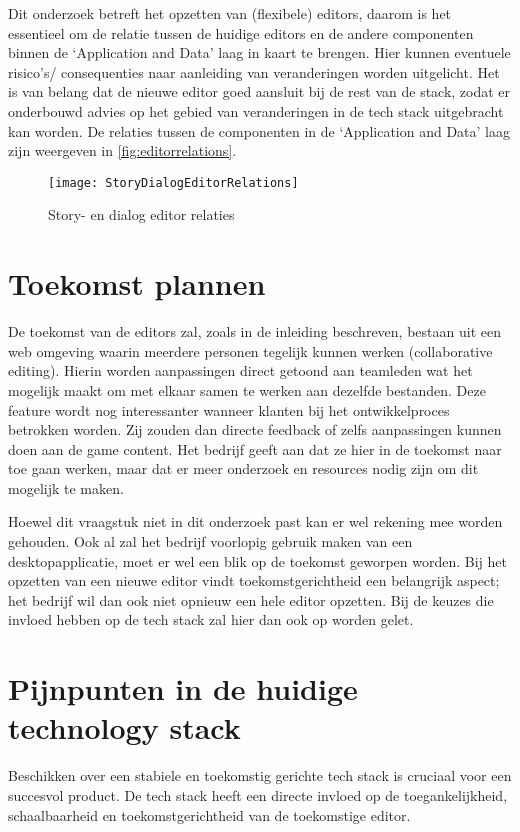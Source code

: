 Dit onderzoek betreft het opzetten van (flexibele) editors, daarom is het essentieel om de relatie tussen de huidige editors en de andere componenten binnen de ‘Application and Data’ laag in kaart te brengen. Hier kunnen eventuele risico’s/ consequenties naar aanleiding van veranderingen worden uitgelicht. Het is van belang dat de nieuwe editor goed aansluit bij de rest van de stack, zodat er onderbouwd advies op het gebied van veranderingen in de tech stack uitgebracht kan worden. De relaties tussen de componenten in de ‘Application and Data’ laag zijn weergeven in \autoref{fig:editorrelations}.

\begin{figure}[htb]
    \centering
    \texttt{[image: StoryDialogEditorRelations]}
    \caption{Story- en dialog editor relaties}
    \label{fig:editorrelations}
\end{figure}

\pagebreak
\section{Toekomst plannen}
\label{sec:editorfuture}
De toekomst van de editors zal, zoals in de inleiding beschreven, bestaan uit een web omgeving waarin meerdere personen tegelijk kunnen werken (collaborative editing). Hierin worden aanpassingen direct getoond aan teamleden wat het mogelijk maakt om met elkaar samen te werken aan dezelfde bestanden. Deze feature wordt nog interessanter wanneer klanten bij het ontwikkelproces betrokken worden. Zij zouden dan directe feedback of zelfs aanpassingen kunnen doen aan de game content. Het bedrijf geeft aan dat ze hier in de toekomst naar toe gaan werken, maar dat er meer onderzoek en resources nodig zijn om dit mogelijk te maken.

Hoewel dit vraagstuk niet in dit onderzoek past kan er wel rekening mee worden gehouden. Ook al zal het bedrijf voorlopig gebruik maken van een desktopapplicatie, moet er wel een blik op de toekomst geworpen worden. Bij het opzetten van een nieuwe editor vindt \organisation{} toekomstgerichtheid een belangrijk aspect; het bedrijf wil dan ook niet opnieuw een hele editor opzetten. Bij de keuzes die invloed hebben op de tech stack zal hier dan ook op worden gelet.

\pagebreak
\section{Pijnpunten in de huidige technology stack}
Beschikken over een stabiele en toekomstig gerichte tech stack is cruciaal voor een succesvol product. De tech stack heeft een directe invloed op de toegankelijkheid, schaalbaarheid en toekomstgerichtheid van de toekomstige editor. 

